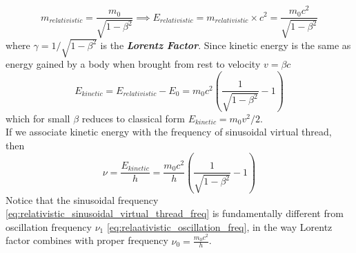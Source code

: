 \documentclass[11pt, a4paper]{article}
\begin{document}
\begin{equation}\label{eq:relativistic_mass_and_energy}
	m_{relativistic} = \frac{m_{0}}{\sqrt{1 - \beta^{2}}} \implies E_{relativistic} = m_{relativistic} \times c^{2} = \frac{m_{0}c^{2}}{\sqrt{1 - \beta^{2}}}
\end{equation}
where $\gamma = 1/\sqrt{1 - \beta^{2}}$ is the \textbf{\textit{Lorentz Factor}}. 
 Since kinetic energy is the same as energy gained by a body when brought from rest to velocity $v=\beta c$
 \begin{equation}\label{eq:relativistic_kinetic_energy}
 	E_{kinetic} = E_{relativistic} - E_{0} = m_{0}c^{2} \left(\frac{1}{\sqrt{1 - \beta^{2}}} - 1 \right)
 \end{equation}
which for small $\beta$ reduces to classical form $E_{kinetic} = m_{0}v^{2}/2$.\\ 
If we associate kinetic energy with the frequency of sinusoidal virtual thread, then
\begin{equation}\label{eq:relativistic_sinusoidal_virtual_thread_freq}
	\nu = \frac{E_{kinetic}}{h} = \frac{m_{0}c^{2}}{h} \left(\frac{1}{\sqrt{1 - \beta^{2}}} - 1\right)
\end{equation}
Notice that the sinusoidal frequency \eqref{eq:relativistic_sinusoidal_virtual_thread_freq} is fundamentally different from oscillation frequency $\nu_{1}$ \eqref{eq:relaativistic_oscillation_freq}, in the way Lorentz factor combines with proper frequency $\nu_{0}=\frac{m_{0}c^{2}}{h}$.
\end{document}
